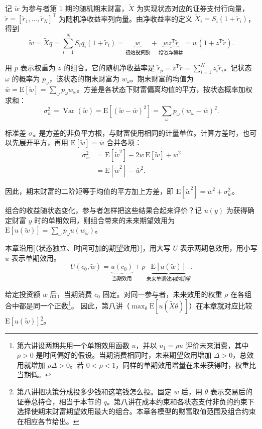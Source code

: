 记 $\widetilde w$ 为参与者第 1 期的随机期末财富，$\widetilde X$ 为实现状态对应的证券支付行向量，$\widetilde r=[\widetilde r_1,\ldots,\widetilde r_N]^{\mathsf T}$ 为随机净收益率列向量。由净收益率的定义 $\widetilde X_i=S_i(1+\widetilde r_i)$，得到
\[
 \widetilde w=\widetilde Xq=\sum_{i=1}^N S_iq_i(1+\widetilde r_i)
 =\underbrace{w}_{\text{初始投资额}}
   +\underbrace{wz^{\mathsf T}\widetilde r}_{\text{投资净损益}}
   =w(1+z^{\mathsf T}\widetilde r).
\]

用 $p$ 表示权重为 $z$ 的组合。它的随机净收益率是 $\widetilde r_p=z^{\mathsf T}\widetilde r=\sum_{i=1}^N z_i\widetilde r_i$。记状态 $\omega$ 的概率为 $p_\omega$，该状态的期末财富为 $w_\omega$。期末财富的均值为 $\bar w=\mathrm E[\widetilde w]=\sum_\omega p_\omega w_\omega$。方差是各状态下财富偏离均值的平方，按状态概率加权求和：
\[
 \sigma_w^2=\operatorname{Var}(\widetilde w)
 =\mathrm E[(\widetilde w-\bar w)^2]
 =\sum_\omega p_\omega(w_\omega-\bar w)^2.
\]

标准差 $\sigma_w$ 是方差的非负平方根，与财富使用相同的计量单位。计算方差时，也可以先展开平方，再用 $\mathrm E[\widetilde w]=\bar w$ 合并各项：
\begin{align*}
 \sigma_w^2
 &=\mathrm E[\widetilde w^2]-2\bar w\,\mathrm E[\widetilde w]+\bar w^2\\
 &=\mathrm E[\widetilde w^2]-\bar w^2.
\end{align*}

因此，期末财富的二阶矩等于均值的平方加上方差，即 $\mathrm E[\widetilde w^2]=\bar w^2+\sigma_w^2$。

组合的收益随状态变化，参与者怎样把这些结果合起来评价？记 $u(y)$ 为获得确定财富 $y$ 时的单期效用，则组合带来的未来期望效用为 $\mathrm E[u(\widetilde w)]=\sum_\omega p_\omega u(w_\omega)$。

本章沿用[（状态独立、时间可加的期望效用）]，用大写 $U$ 表示两期总效用，用小写 $u$ 表示单期效用。
\[
 U(c_0,\widetilde w)
 =\underbrace{u(c_0)}_{\text{当期效用}}
 +\rho\,\underbrace{\mathrm E[u(\widetilde w)]}_{\text{未来单期效用的期望}}.
\]

给定投资额 $w$ 后，当期消费 $c_0$ 固定。对同一参与者，未来效用的权重 $\rho$ 在各组合中都是同一个正数\footnote{第六讲设两期共用一个单期效用函数 $u$，并以 $u_1=\rho u$ 评价未来消费，其中 $\rho>0$ 是时间偏好的假设。当期消费相同时，未来期望效用增加 $\Delta>0$，总效用就增加 $\rho\Delta>0$。若 $0<\rho<1$，同样的单期效用增量在未来获得时，权重比当期低。}。
因此，第八讲（$\max_\theta\mathrm E[u(\widetilde X\theta)]$）在本章就对应比较 $\mathrm E[u(\widetilde w)]$\footnote{第八讲把决策分成投多少钱和这笔钱怎么投。固定 $w$ 后，用 $\theta$ 表示交易后的证券总持仓，相当于本节的 $q$。第八讲在成本约束和各状态支付非负的约束下选择使期末财富期望效用最大的组合。本章各模型的财富取值范围及组合约束在相应各节给出。}。

